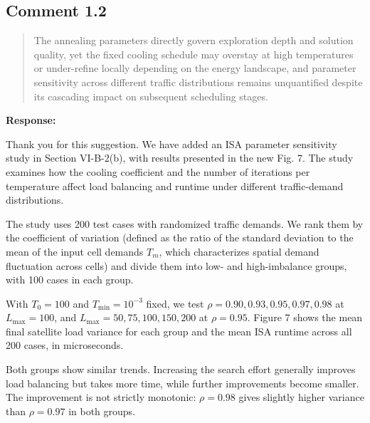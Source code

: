 \documentclass[11pt,a4paper]{article}
\begin{document}

\subsection*{Comment 1.2}

\begin{quote}\small The annealing parameters directly govern exploration depth and solution quality, yet the fixed cooling schedule may overstay at high temperatures or under-refine locally depending on the energy landscape, and parameter sensitivity across different traffic distributions remains unquantified despite its cascading impact on subsequent scheduling stages.\end{quote}

\textbf{Response:}\par

Thank you for this suggestion. We have added an ISA parameter sensitivity study in Section VI-B-2(b), with results presented in the new Fig. 7. The study examines how the cooling coefficient and the number of iterations per temperature affect load balancing and runtime under different traffic-demand distributions.
\par

The study uses 200 test cases with randomized traffic demands. We rank them by the coefficient of variation (defined as the ratio of the standard deviation to the mean of the input cell demands $T_m$, which characterizes spatial demand fluctuation across cells) and divide them into low- and high-imbalance groups, with 100 cases in each group.
\par

With $T_0=100$ and $T_{\min}=10^{-3}$ fixed, we test $\rho=0.90,0.93,0.95,0.97,0.98$ at $L_{\max}=100$, and $L_{\max}=50,75,100,150,200$ at $\rho=0.95$. Figure 7 shows the mean final satellite load variance for each group and the mean ISA runtime across all 200 cases, in microseconds.
\par

Both groups show similar trends. Increasing the search effort generally improves load balancing but takes more time, while further improvements become smaller. The improvement is not strictly monotonic: $\rho=0.98$ gives slightly higher variance than $\rho=0.97$ in both groups.
\par
\end{document}
